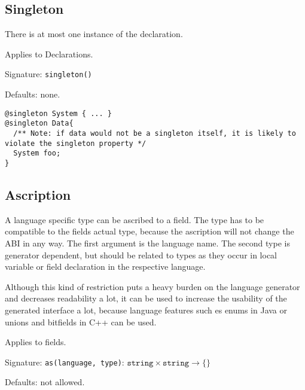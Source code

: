 \documentclass[a4paper,10pt]{article}
\begin{document}
\subsection*{Singleton}
There is at most one instance of the declaration.

Applies to Declarations.

Signature: \verb/singleton()/

Defaults: none.

\begin{lstlisting}[label=singletonExample,caption=Examples,language=skill]
@singleton System { ... }
@singleton Data{
  /** Note: if data would not be a singleton itself, it is likely to violate the singleton property */
  System foo;
}
\end{lstlisting}




\subsection*{Ascription}
A language specific type can be ascribed to a field. The type has to be compatible to the fields actual type, because the ascription will not change the ABI in any way. The first argument is the language name. The second type is generator dependent, but should be related to types as they occur in local variable or field declaration in the respective language.

Although this kind of restriction puts a heavy burden on the language generator and decreases readability a lot, it can be used to increase the usability of the generated interface a lot, because language features such es enums in Java or unions and bitfields in C++ can be used.

Applies to fields.

Signature: \verb/as(language, type)/: $\texttt{string} \times \texttt{string} → \{\}$

Defaults: not allowed.
\end{document}
